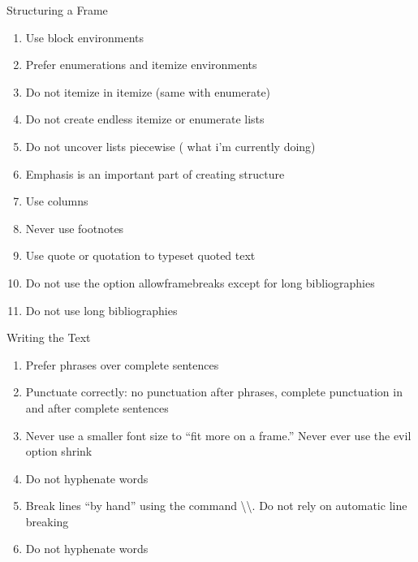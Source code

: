 
\begin{frame}{Structuring a Frame}

    \begin{enumerate} %
        \item<+-| alert@+> Use block environments
        \item<+-| alert@+> Prefer enumerations and itemize environments
        \item<+-| alert@+> Do not itemize in itemize (same with enumerate)
        \item<+-| alert@+> Do not create endless itemize or enumerate lists
        \item<+-| alert@+> Do not uncover lists piecewise ( what i'm currently doing)
        \item<+-| alert@+> Emphasis is an important part of creating structure
        \item<+-| alert@+> Use columns
        \item<+-| alert@+> Never use footnotes
        \item<+-| alert@+> Use quote or quotation to typeset quoted text
        \item<+-| alert@+> Do not use the option allowframebreaks except for long bibliographies
        \item<+-| alert@+> Do not use long bibliographies
    \end{enumerate}
    
\end{frame}


\begin{frame}{Writing the Text}


    \begin{enumerate}
        \item<1-> Prefer phrases over complete sentences %
        \item<1-> Punctuate correctly: no punctuation after phrases, complete punctuation in and after complete sentences %
        \item<2-> Never use a smaller font size to “fit more on a frame.” Never ever use the evil option shrink %
        \item<2-> Do not hyphenate words 
        \item<2-2> Break lines “by hand” using the command \textbackslash\textbackslash . Do not rely on automatic line breaking
        \item<1-2> Do not hyphenate words 
    \end{enumerate}

    
\end{frame}

